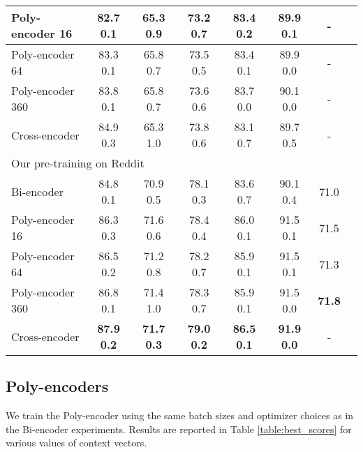 \documentclass{article} \usepackage{iclr2020_conference,times}
\begin{document}
\begin{table*}[h]
\begin{tabular}{|l|c|c|c|c|c|c|c|}
Poly-encoder 16 & 82.7  0.1 & 65.3  0.9 & 73.2  0.7 & 83.4  0.2 & 89.9  0.1 & -  \\ \hline 

Poly-encoder 64 & 83.3  0.1 & 65.8  0.7 & 73.5  0.5 & 83.4  0.1 & 89.9  0.0 & -  \\ \hline 

Poly-encoder 360 & 83.8  0.1 & 65.8  0.7 & 73.6  0.6 &83.7  0.0 & 90.1  0.0 & -  \\ \hline 

Cross-encoder & 84.9  0.3 & 65.3  1.0 & 73.8  0.6 & 83.1  0.7 & 89.7  0.5 & -  \\ 
\hline \hline 
\multicolumn{7}{|l|}{Our pre-training on Reddit}  \\ 
\hline 
Bi-encoder & 84.8  0.1 & 70.9  0.5 & 78.1  0.3 & 83.6  0.7 & 90.1  0.4 & 71.0  \\ \hline 







Poly-encoder 16 & 86.3  0.3 & 71.6  0.6 & 78.4  0.4 & 86.0  0.1 & 91.5  0.1 & 71.5 \\ \hline 

Poly-encoder 64 & 86.5  0.2 & 71.2  0.8 & 78.2  0.7 & 85.9  0.1 & 91.5  0.1 & 71.3\\ \hline 

Poly-encoder 360 & 86.8  0.1 & 71.4  1.0 & 78.3  0.7 & 85.9  0.1 & 91.5  0.0 & \textbf{71.8}\\ \hline 

Cross-encoder & \textbf{87.9  0.2} & \textbf{71.7  0.3} & \textbf{79.0  0.2} & \textbf{86.5  0.1} & \textbf{91.9  0.0} & -  \\ \hline 

\end{tabular}
\caption{Test performance of Bi-, Poly- and Cross-encoders on
our selected tasks.}
\label{table:best_scores}
\vspace{-0.5em}
\end{table*}

\subsection{Poly-encoders}
\label{subsection:poly}


We train the Poly-encoder using the same batch sizes and optimizer choices as in the Bi-encoder experiments. Results are reported in Table \ref{table:best_scores} for various values of  context vectors. 
\end{document}
